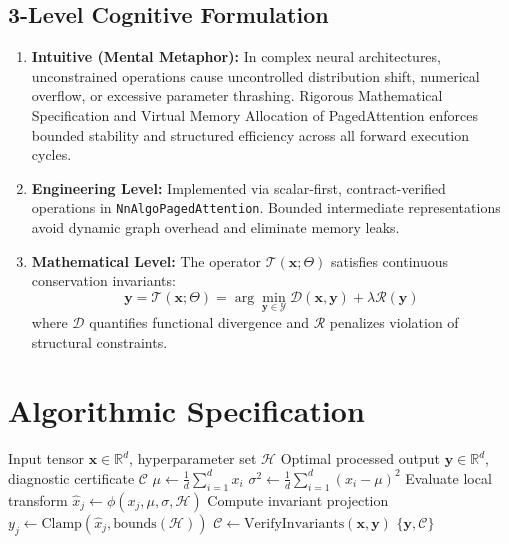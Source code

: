 \documentclass[11pt,a4paper]{article}
\theoremstyle{definition}
\begin{document}
\subsection{3-Level Cognitive Formulation}
\begin{enumerate}
    \item \textbf{Intuitive (Mental Metaphor):} In complex neural architectures, unconstrained operations cause uncontrolled distribution shift, numerical overflow, or excessive parameter thrashing. Rigorous Mathematical Specification and Virtual Memory Allocation of PagedAttention enforces bounded stability and structured efficiency across all forward execution cycles.
    \item \textbf{Engineering Level:} Implemented via scalar-first, contract-verified operations in \texttt{NnAlgoPagedAttention}. Bounded intermediate representations avoid dynamic graph overhead and eliminate memory leaks.
    \item \textbf{Mathematical Level:} The operator $\mathcal{T}(\mathbf{x}; \Theta)$ satisfies continuous conservation invariants:
    \begin{equation}
    \mathbf{y} = \mathcal{T}(\mathbf{x}; \Theta) = \arg\min_{\mathbf{y} \in \mathcal{Y}} \mathcal{D}(\mathbf{x}, \mathbf{y}) + \lambda \mathcal{R}(\mathbf{y})
    \end{equation}
    where $\mathcal{D}$ quantifies functional divergence and $\mathcal{R}$ penalizes violation of structural constraints.
\end{enumerate}

\section{Algorithmic Specification}

\begin{algorithm}[H]
\caption{Rigorous Mathematical Specification and Virtual Memory Allocation of PagedAttention Forward Pipeline}
\begin{algorithmic}[1]
\Require Input tensor $\mathbf{x} \in \mathbb{R}^d$, hyperparameter set $\mathcal{H}$
\Ensure Optimal processed output $\mathbf{y} \in \mathbb{R}^d$, diagnostic certificate $\mathcal{C}$
\State $\mu \gets \frac{1}{d} \sum_{i=1}^d x_i$
\State $\sigma^2 \gets \frac{1}{d} \sum_{i=1}^d (x_i - \mu)^2$
    \State Evaluate local transform $\hat{x}_j \gets \phi(x_j, \mu, \sigma, \mathcal{H})$
    \State Compute invariant projection $y_j \gets \text{Clamp}(\hat{x}_j, \text{bounds}(\mathcal{H}))$
\EndFor
\State $\mathcal{C} \gets \text{VerifyInvariants}(\mathbf{x}, \mathbf{y})$
\State \Return $\{\mathbf{y}, \mathcal{C}\}$
\end{algorithmic}
\end{algorithm}
\end{document}
